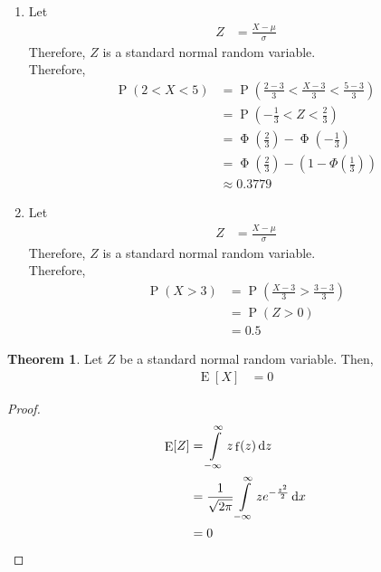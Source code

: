 \documentclass[titlepage, fleqn, a4paper, 12pt, twoside]{article}
\theoremstyle{definition}
\theoremstyle{theorem}
\newtheorem{theorem}{Theorem}
\DeclareMathOperator{\prob}{\mathrm{P}}
\DeclareMathOperator{\expct}{\mathrm{E}}
\DeclareMathOperator{\pdf}{\mathrm{f}}
\DeclareMathOperator{\stdnormalcdf}{\mathrm{\Phi}}
\begin{document}
\begin{solution}
	\begin{enumerate}[leftmargin=*]
		\item
			Let
			\begin{align*}
				Z &= \frac{X - \mu}{\sigma}
			\end{align*}
			Therefore, $Z$ is a standard normal random variable.\\
			Therefore,
			\begin{align*}
				\prob(2 < X < 5) &= \prob\left( \frac{2 - 3}{3} < \frac{X - 3}{3} < \frac{5 - 3}{3} \right)\\
				&= \prob\left( -\frac{1}{3} < Z < \frac{2}{3} \right)\\
				&= \stdnormalcdf\left( \frac{2}{3} \right) - \stdnormalcdf\left( -\frac{1}{3} \right)\\
				&= \stdnormalcdf\left( \frac{2}{3} \right) - \left( 1 - \Phi\left( \frac{1}{3} \right) \right)\\
				&\approx 0.3779
			\end{align*}
		\item
			Let
			\begin{align*}
				Z &= \frac{X - \mu}{\sigma}
			\end{align*}
			Therefore, $Z$ is a standard normal random variable.\\
			Therefore,
			\begin{align*}
				\prob(X > 3) &= \prob\left( \frac{X - 3}{3} > \frac{3 - 3}{3} \right)\\
				&= \prob(Z > 0)\\
				&= 0.5
			\end{align*}
	\end{enumerate}
\end{solution}

\begin{theorem}
	Let $Z$ be a standard normal random variable.
	Then,
	\begin{align*}
		\expct[X] &= 0
	\end{align*}
\end{theorem}

\begin{proof}
	\begin{align*}
		\expct[Z] &= \int\limits_{-\infty}^{\infty} z \pdf(z) \dif z\\
		&= \frac{1}{\sqrt{2 \pi}} \int\limits_{-\infty}^{\infty} z e^{-\frac{z^2}{2}} \dif x\\
		&= 0
	\end{align*}
\end{proof}
\end{document}
